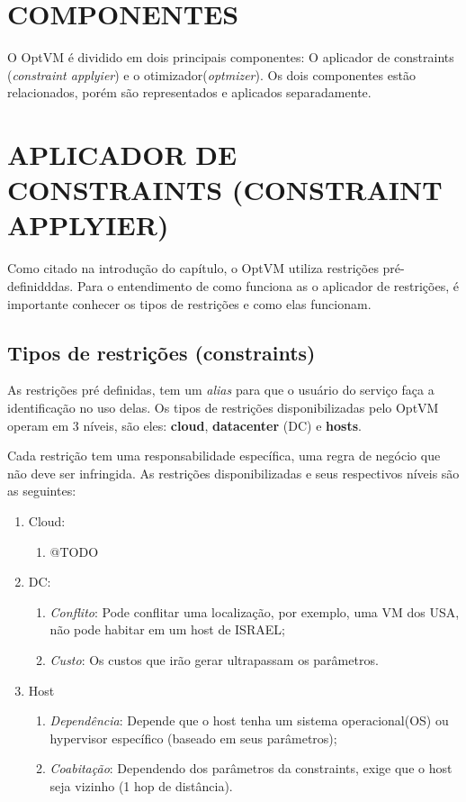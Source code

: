 \section{COMPONENTES}
O OptVM é dividido em dois principais componentes: O aplicador de constraints (\textit{constraint applyier})
e o otimizador(\textit{optmizer}). Os dois componentes estão relacionados, porém são representados e 
aplicados separadamente. 

\section{APLICADOR DE CONSTRAINTS (CONSTRAINT APPLYIER)}

Como citado na introdução do capítulo, o OptVM utiliza restrições pré-definidddas.
Para o entendimento de como funciona as o aplicador de restrições, é importante conhecer os tipos de 
restrições e como elas funcionam.

\subsection{Tipos de restrições (constraints)}

As restrições pré definidas, tem um \textit{alias} para que o usuário do serviço faça a identificação no uso delas.
Os tipos de restrições disponibilizadas pelo OptVM operam em 3 níveis, são eles: \textbf{cloud}, \textbf{datacenter} (DC)
e \textbf{hosts}.

Cada restrição tem uma responsabilidade específica, uma regra de negócio que não deve ser infringida. 
As restrições disponibilizadas e seus respectivos níveis são as seguintes:

\begin{enumerate}
  \item Cloud:
  \begin{enumerate}
    \item @TODO
  \end{enumerate}

  \item DC:
  \begin{enumerate}
    \item \textit{Conflito}: Pode conflitar uma localização, por exemplo, uma VM dos USA, não pode habitar em um host de ISRAEL;
    \item \textit{Custo}: Os custos que irão gerar ultrapassam os parâmetros.
  \end{enumerate}

 \item Host
  \begin{enumerate}
    \item \textit{Dependência}: Depende que o host tenha um sistema operacional(OS) ou hypervisor específico (baseado em seus parâmetros);
    \item \textit{Coabitação}: Dependendo dos parâmetros da constraints, exige que o host seja vizinho (1 hop de distância).
  \end{enumerate}
  
\end{enumerate}

